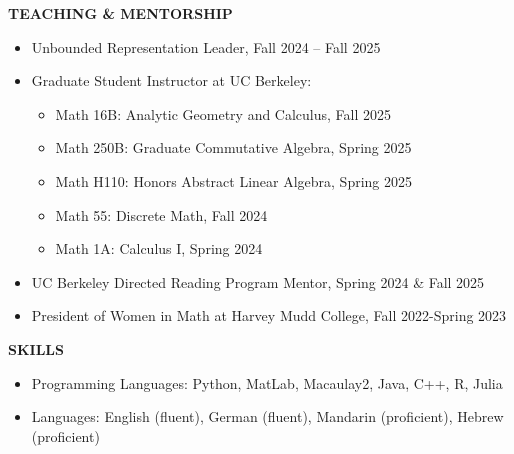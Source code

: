 \documentclass[11pt]{article}
\newcommand{\hdr}[1]{\textcolor{blue(ryb)}{\textbf{#1}}}
\begin{document}
\hdr{TEACHING \& MENTORSHIP}\\
\begin{itemize}
\item Unbounded Representation Leader, Fall 2024 -- Fall 2025
\item Graduate Student Instructor at UC Berkeley:
  \begin{itemize}
  \item Math 16B: Analytic Geometry and Calculus, Fall 2025
  \item Math 250B: Graduate Commutative Algebra, Spring 2025
  \item Math H110: Honors Abstract Linear Algebra, Spring 2025
  \item Math 55: Discrete Math, Fall 2024
  \item Math 1A: Calculus I, Spring 2024
  \end{itemize}
\item UC Berkeley Directed Reading Program Mentor, Spring 2024 \& Fall 2025
\item President of Women in Math at Harvey Mudd College, Fall 2022-Spring 2023
\end{itemize}

\bigskip

\hdr{SKILLS}\\
\begin{itemize}
\item 
Programming Languages: Python, MatLab, Macaulay2, Java, C++, R, Julia\\
\item 
Languages: English (fluent), German (fluent), Mandarin (proficient), Hebrew (proficient)
\end{itemize}
\end{document}
